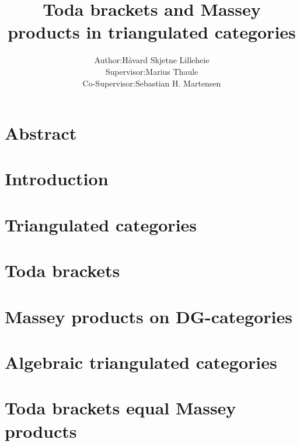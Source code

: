 \documentclass[a4paper, 10pt]{article}
\title{Toda brackets and Massey products in triangulated categories}
\author{
    \begin{tabular}{rl}
        Author:& Håvard Skjetne Lilleheie\\
        Supervisor:& Marius Thaule\\
        Co-Supervisor:& Sebastian H. Martensen
    \end{tabular}
}
\begin{document}
\maketitle

\tableofcontents

\section*{Abstract}


\section{Introduction}


\section{Triangulated categories}
\label{section:tri_cats}


\section{Toda brackets}
\label{section:toda_brackets}


\section{Massey products on DG-categories}
\label{section:massey_prods_on_dg_cats}


\section{Algebraic triangulated categories}
\label{section:alg_tri_cats}


\section{Toda brackets equal Massey products}
\label{section:toda_eq_massey}


{}

\end{document}
